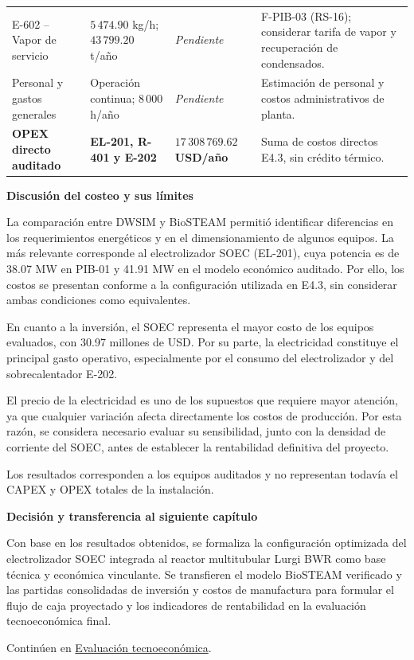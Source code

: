\documentclass[11pt,letterpaper]{article}
\newcommand{\Guia}[2]{%
  \begin{tcolorbox}[colback=Arena,colframe=Terracota,boxrule=0.35pt,
    leftrule=2pt,arc=0pt,left=7pt,right=7pt,
    top=4pt,bottom=4pt,before skip=5pt,after skip=5pt]
    {\sffamily\small\bfseries\color{Grafito}#1}\par #2
  \end{tcolorbox}}
\begin{document}
\begin{tabularx}{\linewidth}{@{}Y Y Y Y@{}}
E-602 -- Vapor de servicio &
$5\,474.90$ kg/h;
$43\,799.20$ t/año &
\textit{Pendiente} &
F-PIB-03 (RS-16);
considerar tarifa de vapor y
recuperación de condensados. \\

Personal y gastos generales &
Operación continua;
$8\,000$ h/año &
\textit{Pendiente} &
Estimación de personal y costos
administrativos de planta. \\

\textbf{OPEX directo auditado} &
\textbf{EL-201, R-401 y E-202} &
\textbf{$17\,308\,769.62$ USD/año} &
Suma de costos directos E4.3,
sin crédito térmico. \\

\bottomrule
\end{tabularx}
\Guia{Discusión del costeo y sus límites}{%
La comparación entre DWSIM y BioSTEAM permitió identificar
diferencias en los requerimientos energéticos y en el
dimensionamiento de algunos equipos. La más relevante
corresponde al electrolizador SOEC (EL-201), cuya potencia
es de 38.07 MW en PIB-01 y 41.91 MW en el modelo
económico auditado. Por ello, los costos se presentan
conforme a la configuración utilizada en E4.3, sin
considerar ambas condiciones como equivalentes.

En cuanto a la inversión, el SOEC representa el mayor
costo de los equipos evaluados, con 30.97 millones de USD.
Por su parte, la electricidad constituye el principal
gasto operativo, especialmente por el consumo del
electrolizador y del sobrecalentador E-202.

El precio de la electricidad es uno de los supuestos
que requiere mayor atención, ya que cualquier variación
afecta directamente los costos de producción. Por esta
razón, se considera necesario evaluar su sensibilidad,
junto con la densidad de corriente del SOEC, antes de
establecer la rentabilidad definitiva del proyecto.

Los resultados corresponden a los equipos auditados
y no representan todavía el CAPEX y OPEX totales
de la instalación.
}

\Guia{Decisión y transferencia al siguiente capítulo}{%
  Con base en los resultados obtenidos, se formaliza la configuración optimizada del electrolizador SOEC integrada al reactor multitubular Lurgi BWR como base técnica y económica vinculante. Se transfieren el modelo BioSTEAM verificado y las partidas consolidadas de inversión y costos de manufactura para formular el flujo de caja proyectado y los indicadores de rentabilidad en la evaluación tecnoeconómica final.
  \par\smallskip Continúen en \hyperref[cap:tea]{Evaluación tecnoeconómica}.}
\end{document}

